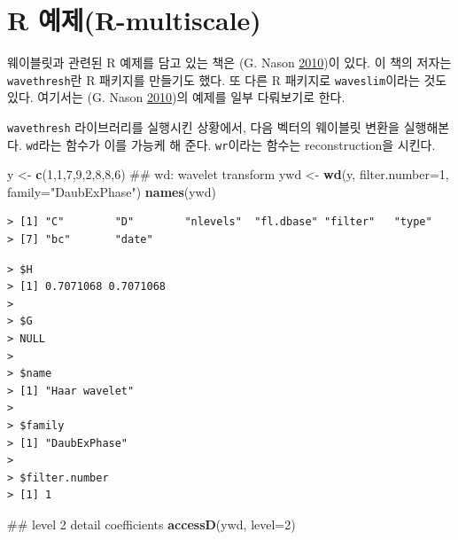 \documentclass[b5paper,]{book}
\makeatletter
\newenvironment{Shaded}{\begin{snugshade}}{\end{snugshade}}
\newcommand{\KeywordTok}[1]{\textcolor[rgb]{0.13,0.29,0.53}{\textbf{{#1}}}}
\newcommand{\DataTypeTok}[1]{\textcolor[rgb]{0.13,0.29,0.53}{{#1}}}
\newcommand{\DecValTok}[1]{\textcolor[rgb]{0.00,0.00,0.81}{{#1}}}
\newcommand{\StringTok}[1]{\textcolor[rgb]{0.31,0.60,0.02}{{#1}}}
\newcommand{\NormalTok}[1]{{#1}}
\newenvironment{kframe}{%
\medskip{}
\setlength{\fboxsep}{.8em}
 \def\at@end@of@kframe{}%
 \ifinner\ifhmode%
  \def\at@end@of@kframe{\end{minipage}}%
  \begin{minipage}{\columnwidth}%
 \fi\fi%
 \def\FrameCommand##1{\hskip\@totalleftmargin \hskip-\fboxsep
 \colorbox{shadecolor}{##1}\hskip-\fboxsep
     \hskip-\linewidth \hskip-\@totalleftmargin \hskip\columnwidth}%
 \MakeFramed {\advance\hsize-\width
   \@totalleftmargin\z@ \linewidth\hsize
   \@setminipage}}%
 {\par\unskip\endMakeFramed%
 \at@end@of@kframe}
\renewenvironment{Shaded}{\begin{kframe}}{\end{kframe}}
\theoremstyle{definition}
\theoremstyle{definition}
\theoremstyle{definition}
\theoremstyle{remark}
\makeatother
\begin{document}
\section{R 예제(R-multiscale)}\label{r-r-multiscale}

웨이블릿과 관련된 R 예제를 담고 있는 책은 (G. Nason
\protect\hyperlink{ref-Nason2010}{2010})이 있다. 이 책의 저자는
\texttt{wavethresh}란 R 패키지를 만들기도 했다. 또 다른 R 패키지로
\texttt{waveslim}이라는 것도 있다. 여기서는 (G. Nason
\protect\hyperlink{ref-Nason2010}{2010})의 예제를 일부 다뤄보기로 한다.

\texttt{wavethresh} 라이브러리를 실행시킨 상황에서, 다음 벡터의 웨이블릿
변환을 실행해본다. \texttt{wd}라는 함수가 이를 가능케 해 준다.
\texttt{wr}이라는 함수는 reconstruction을 시킨다.

\begin{Shaded}
\begin{Highlighting}[]
\NormalTok{y <-}\StringTok{ }\KeywordTok{c}\NormalTok{(}\DecValTok{1}\NormalTok{,}\DecValTok{1}\NormalTok{,}\DecValTok{7}\NormalTok{,}\DecValTok{9}\NormalTok{,}\DecValTok{2}\NormalTok{,}\DecValTok{8}\NormalTok{,}\DecValTok{8}\NormalTok{,}\DecValTok{6}\NormalTok{)}
\NormalTok{## wd: wavelet transform}
\NormalTok{ywd <-}\StringTok{ }\KeywordTok{wd}\NormalTok{(y, }\DataTypeTok{filter.number=}\DecValTok{1}\NormalTok{, }\DataTypeTok{family=}\StringTok{"DaubExPhase"}\NormalTok{)}
\KeywordTok{names}\NormalTok{(ywd)}
\end{Highlighting}
\end{Shaded}

\begin{verbatim}
> [1] "C"        "D"        "nlevels"  "fl.dbase" "filter"   "type"    
> [7] "bc"       "date"
\end{verbatim}

\begin{Shaded}
\end{Shaded}

\begin{verbatim}
> $H
> [1] 0.7071068 0.7071068
> 
> $G
> NULL
> 
> $name
> [1] "Haar wavelet"
> 
> $family
> [1] "DaubExPhase"
> 
> $filter.number
> [1] 1
\end{verbatim}

\begin{Shaded}
\begin{Highlighting}[]
\NormalTok{## level 2 detail coefficients}
\KeywordTok{accessD}\NormalTok{(ywd, }\DataTypeTok{level=}\DecValTok{2}\NormalTok{)}
\end{Highlighting}
\end{Shaded}
\end{document}

